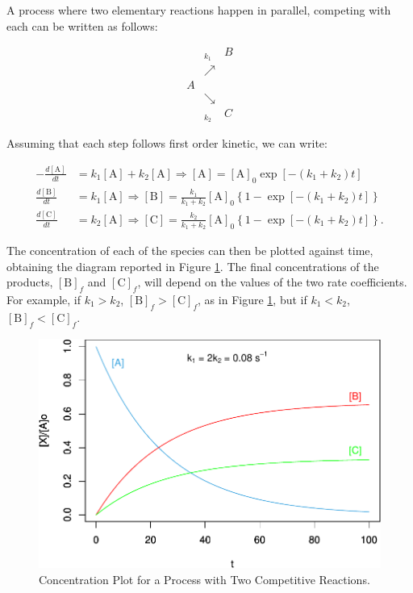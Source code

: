 \documentclass[
  9pt,
]{extbook}
\theoremstyle{definition}
\theoremstyle{definition}
\theoremstyle{definition}
\theoremstyle{remark}
\begin{document}
A process where two elementary reactions happen in parallel, competing with each can be written as follows:

\begin{equation}
\begin{matrix}
 &_{k_1}  & B\\
 &\nearrow & \\
A &   & \\
 &\searrow& \\
  &_{k_2}  & C
\end{matrix}
\end{equation}

Assuming that each step follows first order kinetic, we can write:

\begin{equation}
\begin{aligned}
-\frac{d[\mathrm{A}]}{dt} &=k_1 [\mathrm{A}]+k_2 [\mathrm{A}] \Rightarrow [\mathrm{A}]=[\mathrm{A}]_0\exp \left[ -(k_1+k_2)t \right] \\
\frac{d[\mathrm{B}]}{dt} &=k_1 [\mathrm{A}] \Rightarrow [\mathrm{B}]=\frac{k_1}{k_1+k_2}[\mathrm{A}]_0 \left\{ 1-\exp \left[ -(k_1+k_2)t \right] \right\} \\
\frac{d[\mathrm{C}]}{dt} &=k_2 [\mathrm{A}]\Rightarrow [\mathrm{C}]=\frac{k_2}{k_1+k_2}[\mathrm{A}]_0 \left\{ 1-\exp \left[ -(k_1+k_2)t \right] \right\}.
\end{aligned}
\label{eq:kincomp2}
\end{equation}

The concentration of each of the species can then be plotted against time, obtaining the diagram reported in Figure \ref{fig:figk7}. The final concentrations of the products, \([\mathrm{B}]_f\) and \([\mathrm{C}]_f\), will depend on the values of the two rate coefficients. For example, if \(k_1>k_2\), \([\mathrm{B}]_f>[\mathrm{C}]_f\), as in Figure \ref{fig:figk7}, but if \(k_1<k_2\), \([\mathrm{B}]_f<[\mathrm{C}]_f\).

\begin{figure}

{\centering \includegraphics{pchem1_files/figure-latex/figk7-1} 

}

\caption{Concentration Plot for a Process with Two Competitive Reactions.}\label{fig:figk7}
\end{figure}
\end{document}
